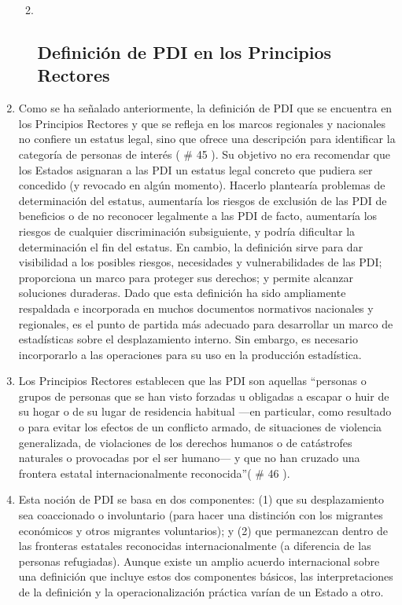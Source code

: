 \documentclass[
]{book}
\begin{document}
\begin{enumerate}
  \begin{enumerate}
  \def\labelenumii{\arabic{enumii}.}
  \item ~
    \hypertarget{definiciuxf3n-de-pdi-en-los-principios-rectores}{%
    \subsection{Definición de PDI en los Principios Rectores}\label{definiciuxf3n-de-pdi-en-los-principios-rectores}}
  \end{enumerate}
\item
  Como se ha señalado anteriormente, la definición de PDI que se encuentra en los Principios Rectores y que se refleja en los marcos regionales y nacionales no confiere un estatus legal, sino que ofrece una descripción para identificar la categoría de personas de interés (
  \# 45
  ). Su objetivo no era recomendar que los Estados asignaran a las PDI un estatus legal concreto que pudiera ser concedido (y revocado en algún momento). Hacerlo plantearía problemas de determinación del estatus, aumentaría los riesgos de exclusión de las PDI de beneficios o de no reconocer legalmente a las PDI de facto, aumentaría los riesgos de cualquier discriminación subsiguiente, y podría dificultar la determinación el fin del estatus. En cambio, la definición sirve para dar visibilidad a los posibles riesgos, necesidades y vulnerabilidades de las PDI; proporciona un marco para proteger sus derechos; y permite alcanzar soluciones duraderas. Dado que esta definición ha sido ampliamente respaldada e incorporada en muchos documentos normativos nacionales y regionales, es el punto de partida más adecuado para desarrollar un marco de estadísticas sobre el desplazamiento interno. Sin embargo, es necesario incorporarlo a las operaciones para su uso en la producción estadística.
\item
  Los Principios Rectores establecen que las PDI son aquellas ``personas o grupos de personas que se han visto forzadas u obligadas a escapar o huir de su hogar o de su lugar de residencia habitual ---en particular, como resultado o para evitar los efectos de un conflicto armado, de situaciones de violencia generalizada, de violaciones de los derechos humanos o de catástrofes naturales o provocadas por el ser humano--- y que no han cruzado una frontera estatal internacionalmente reconocida''(
  \# 46
  ).
\item
  Esta noción de PDI se basa en dos componentes: (1) que su desplazamiento sea coaccionado o involuntario (para hacer una distinción con los migrantes económicos y otros migrantes voluntarios); y (2) que permanezcan dentro de las fronteras estatales reconocidas internacionalmente (a diferencia de las personas refugiadas). Aunque existe un amplio acuerdo internacional sobre una definición que incluye estos dos componentes básicos, las interpretaciones de la definición y la operacionalización práctica varían de un Estado a otro.

\end{enumerate}
\end{document}
